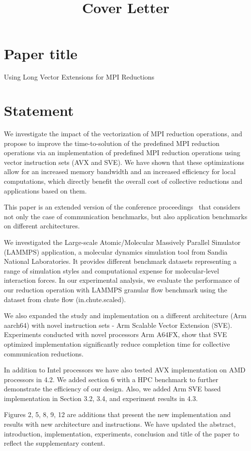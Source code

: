 \documentclass[1p,times]{elsarticle}
\begin{document}
\title{Cover Letter}

\section*{Paper title}
Using Long Vector Extensions for MPI Reductions

\section*{Statement}

We investigate the impact of the vectorization of MPI reduction
operations, and propose to improve the
time-to-solution of the predefined MPI reduction operations via an implementation of predefined MPI reduction
operations using vector instruction sets (AVX and SVE).
We have shown that these optimizations allow for an increased memory bandwidth and an increased
efficiency for local computations, which directly benefit the overall cost of
collective reductions and applications based on them.

This paper is an extended version of the conference proceedings~\cite{avxeurpmpi2020}
that considers not only the case of communication benchmarks, but also application benchmarks on different architectures.

We investigated the Large-scale Atomic/Molecular Massively Parallel Simulator (LAMMPS) application, a
molecular dynamics simulation tool from Sandia National Laboratories.
It provides different benchmark datasets representing a range of simulation styles
and computational expense for molecular-level interaction forces.
In our experimental analysis, we evaluate the performance of our reduction
operation with LAMMPS granular flow benchmark using the dataset from chute flow (in.chute.scaled).

We also expanded the study and implementation on a different architecture (Arm aarch64)
with novel instruction sets - Arm Scalable Vector Extension (SVE).
Experiments conducted with novel processors Arm A64FX, show that SVE optimized implementation
significantly reduce completion time for collective communication reductions.

In addition to Intel processors we have also tested AVX implementation on AMD processors in 4.2. We added section 6 with a
HPC benchmark to further demonstrate the efficiency of our design.
Also, we added Arm SVE based implementation in Section 3.2, 3.4, and experiment results in 4.3.

Figures 2, 5, 8, 9, 12 are additions that present the new implementation and
results with new architecture and instructions. We have updated the abstract, introduction, implementation, experiments,
conclusion and title of the paper to reflect the supplementary content.



\end{document}
